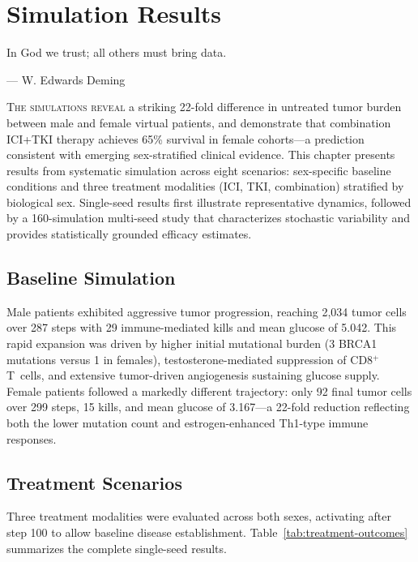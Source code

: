 \chapter{Simulation Results}
\label{ch:simulation-results}

\epigraph{In God we trust; all others must bring data.}{--- W. Edwards Deming}

\lettrine[lines=2]{T}{he simulations reveal} a striking 22-fold difference in untreated tumor burden between male and female virtual patients, and demonstrate that combination ICI+TKI therapy achieves 65\% survival in female cohorts---a prediction consistent with emerging sex-stratified clinical evidence. This chapter presents results from systematic simulation across eight scenarios: sex-specific baseline conditions and three treatment modalities (ICI, TKI, combination) stratified by biological sex. Single-seed results first illustrate representative dynamics, followed by a 160-simulation multi-seed study that characterizes stochastic variability and provides statistically grounded efficacy estimates.

\section{Baseline Simulation}
\label{sec:baseline-sim}

Male patients exhibited aggressive tumor progression, reaching 2,034 tumor cells over 287 steps with 29 immune-mediated kills and mean glucose of 5.042. This rapid expansion was driven by higher initial mutational burden (3 BRCA1 mutations versus 1 in females), testosterone-mediated suppression of CD8$^+$ T~cells, and extensive tumor-driven angiogenesis sustaining glucose supply. Female patients followed a markedly different trajectory: only 92 final tumor cells over 299 steps, 15 kills, and mean glucose of 3.167---a 22-fold reduction reflecting both the lower mutation count and estrogen-enhanced Th1-type immune responses.

\FloatBarrier
\section{Treatment Scenarios}
\label{sec:treatment-scenarios}

Three treatment modalities were evaluated across both sexes, activating after step 100 to allow baseline disease establishment. Table~\ref{tab:treatment-outcomes} summarizes the complete single-seed results.


